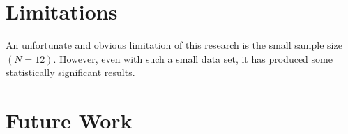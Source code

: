 \section{Limitations}
    An unfortunate and obvious limitation of this research is the small sample size $(N=12)$. %
However, even with such a small data set, it has produced some statistically significant results. 

            

\section{Future Work}

